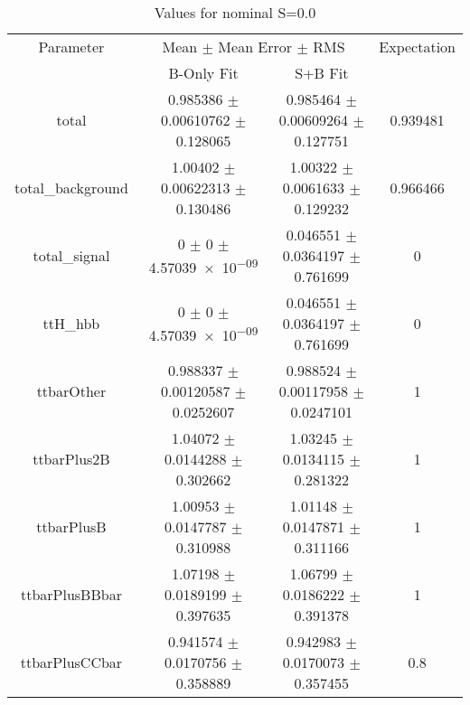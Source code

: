 \begin{table}
\centering
\caption{Values for nominal S=0.0}
\begin{tabular}{cccc}
\toprule
Parameter & \multicolumn{2}{c}{Mean $\pm$ Mean Error $\pm$ RMS} & Expectation\\
 & B-Only Fit & S+B Fit & \\
\midrule
total & \num{0.985386} $\pm$ \num{0.00610762} $\pm$ \num{0.128065} & \num{0.985464} $\pm$ \num{0.00609264} $\pm$ \num{0.127751} & \num{0.939481}\\
total\_background & \num{1.00402} $\pm$ \num{0.00622313} $\pm$ \num{0.130486} & \num{1.00322} $\pm$ \num{0.0061633} $\pm$ \num{0.129232} & \num{0.966466}\\
total\_signal & \num{0} $\pm$ \num{0} $\pm$ \num{4.57039e-09} & \num{0.046551} $\pm$ \num{0.0364197} $\pm$ \num{0.761699} & \num{0}\\
ttH\_hbb & \num{0} $\pm$ \num{0} $\pm$ \num{4.57039e-09} & \num{0.046551} $\pm$ \num{0.0364197} $\pm$ \num{0.761699} & \num{0}\\
ttbarOther & \num{0.988337} $\pm$ \num{0.00120587} $\pm$ \num{0.0252607} & \num{0.988524} $\pm$ \num{0.00117958} $\pm$ \num{0.0247101} & \num{1}\\
ttbarPlus2B & \num{1.04072} $\pm$ \num{0.0144288} $\pm$ \num{0.302662} & \num{1.03245} $\pm$ \num{0.0134115} $\pm$ \num{0.281322} & \num{1}\\
ttbarPlusB & \num{1.00953} $\pm$ \num{0.0147787} $\pm$ \num{0.310988} & \num{1.01148} $\pm$ \num{0.0147871} $\pm$ \num{0.311166} & \num{1}\\
ttbarPlusBBbar & \num{1.07198} $\pm$ \num{0.0189199} $\pm$ \num{0.397635} & \num{1.06799} $\pm$ \num{0.0186222} $\pm$ \num{0.391378} & \num{1}\\
ttbarPlusCCbar & \num{0.941574} $\pm$ \num{0.0170756} $\pm$ \num{0.358889} & \num{0.942983} $\pm$ \num{0.0170073} $\pm$ \num{0.357455} & \num{0.8}\\
\bottomrule
\end{tabular}
\end{table}